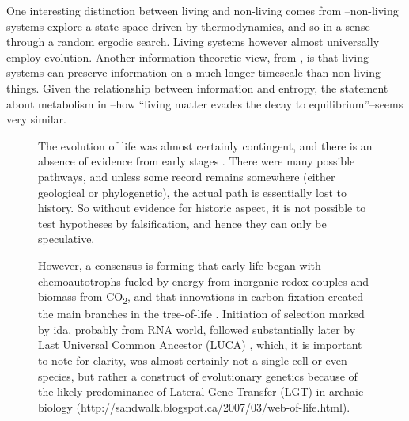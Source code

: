 One interesting distinction between living and non-living comes from \parencite{Rasmussen2004}--non-living systems explore a state-space driven by thermodynamics, and so in a sense through a random ergodic search. Living systems however almost universally employ evolution. Another information-theoretic view, from \parencite{Adami2015}, is that living systems can preserve information on a much longer timescale than non-living things. Given the relationship between information and entropy, the statement about metabolism in \cite{Schrodinger1944}--how ``living matter evades the decay to equilibrium''--seems very similar.

\begin{figure}
\begin{mdframed}


The evolution of life was almost certainly contingent, and there is an absence of evidence from early stages \parencite{Pross2013}. There were many possible pathways, and unless some record remains somewhere (either geological or phylogenetic), the actual path is essentially lost to history. So without evidence for historic aspect, it is not possible to test hypotheses by falsification, and hence they can only be speculative.

However, a consensus is forming that early life began with chemoautotrophs fueled by energy from inorganic redox couples and biomass from CO\textsubscript{2}, and that innovations in carbon-fixation created the main branches in the tree-of-life \parencite{Braakman2012}. Initiation of selection marked by \gls{ida}, probably from RNA world, followed substantially later by Last Universal Common Ancestor (LUCA) \parencite{Yarus2011}, which, it is important to note for clarity, was almost certainly not a single cell or even species, but rather a construct of evolutionary genetics because of the likely predominance of Lateral Gene Transfer (LGT) in archaic biology (http://sandwalk.blogspot.ca/2007/03/web-of-life.html).


\end{mdframed}
\end{figure}

